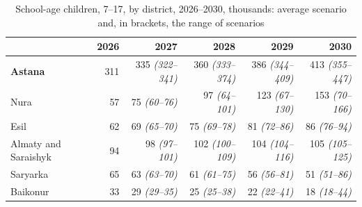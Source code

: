\begin{table}[ht]
\centering
\caption{School-age children, 7--17, by district, 2026--2030, thousands: average scenario and, in brackets, the range of scenarios}
\label{tab:projection-school}
\footnotesize
\setlength{\tabcolsep}{3.5pt}
\begin{tabular}{lrrrrr}
\toprule
& 2026 & 2027 & 2028 & 2029 & 2030 \\
\midrule
\textbf{Astana} & 311 & 335 \textit{\scriptsize(322--341)} & 360 \textit{\scriptsize(333--374)} & 386 \textit{\scriptsize(344--409)} & 413 \textit{\scriptsize(355--447)} \\
\midrule
Nura & 57 & 75 \textit{\scriptsize(60--76)} & 97 \textit{\scriptsize(64--101)} & 123 \textit{\scriptsize(67--130)} & 153 \textit{\scriptsize(70--166)} \\
Esil & 62 & 69 \textit{\scriptsize(65--70)} & 75 \textit{\scriptsize(69--78)} & 81 \textit{\scriptsize(72--86)} & 86 \textit{\scriptsize(76--94)} \\
Almaty and Saraishyk & 94 & 98 \textit{\scriptsize(97--101)} & 102 \textit{\scriptsize(100--109)} & 104 \textit{\scriptsize(104--116)} & 105 \textit{\scriptsize(105--125)} \\
Saryarka & 65 & 63 \textit{\scriptsize(63--70)} & 61 \textit{\scriptsize(61--75)} & 56 \textit{\scriptsize(56--81)} & 51 \textit{\scriptsize(51--86)} \\
Baikonur & 33 & 29 \textit{\scriptsize(29--35)} & 25 \textit{\scriptsize(25--38)} & 22 \textit{\scriptsize(22--41)} & 18 \textit{\scriptsize(18--44)} \\
\bottomrule
\end{tabular}
\end{table}

